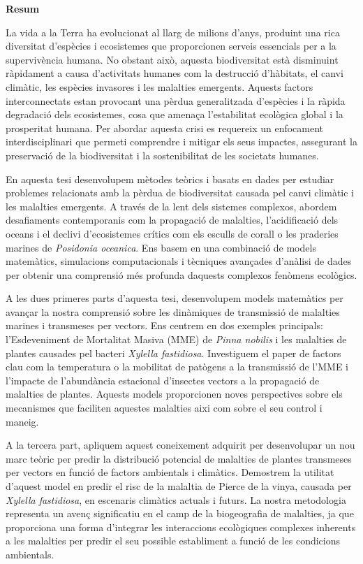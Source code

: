\begin{center}
    \textbf{\Large Resum}
\end{center}

La vida a la Terra ha evolucionat al llarg de milions d'anys,
produint una rica diversitat d'espècies i ecosistemes que proporcionen serveis
essencials per a la supervivència humana. No obstant això, aquesta
biodiversitat està disminuint ràpidament a causa d'activitats humanes
com la destrucció d'hàbitats, el canvi climàtic, les espècies invasores i les
malalties emergents. Aquests factors interconnectats estan provocant una pèrdua
generalitzada d'espècies i la ràpida degradació dels ecosistemes, cosa que
amenaça l'estabilitat ecològica global i la prosperitat humana. Per abordar
aquesta crisi es requereix un enfocament interdisciplinari que permeti
comprendre i mitigar els seus impactes, assegurant la preservació de la
biodiversitat i la sostenibilitat de les societats humanes.

En aquesta tesi desenvolupem mètodes teòrics i basats en dades per estudiar
problemes relacionats amb la pèrdua de biodiversitat causada pel canvi
climàtic i les malalties emergents. A través de la lent dels sistemes
complexos, abordem desafiaments contemporanis com la propagació de malalties,
l'acidificació dels oceans i el declivi d'ecosistemes crítics com els esculls
de corall o les praderies marines de \textit{Posidonia oceanica}. Ens basem en
una combinació de models matemàtics, simulacions computacionals i tècniques
avançades d'anàlisi de dades per obtenir una comprensió més profunda daquests
complexos fenòmens ecològics.

A les dues primeres parts d'aquesta tesi, desenvolupem models matemàtics
per avançar la nostra comprensió sobre les dinàmiques de transmissió de
malalties marines i transmeses per vectors. Ens centrem en dos exemples
principals:
l'Esdeveniment de Mortalitat Masiva (MME) de \textit{Pinna nobilis} i les
malalties de plantes causades pel bacteri \textit{Xylella fastidiosa}.
Investiguem el paper de factors clau com la temperatura o la mobilitat de
patògens a la transmissió de l'MME i l'impacte de l'abundància estacional
d'insectes vectors a la propagació de malalties de plantes. Aquests models
proporcionen noves perspectives sobre els mecanismes que faciliten aquestes
malalties aixi com sobre el seu control i maneig.

A la tercera part, apliquem aquest coneixement adquirit per desenvolupar un
nou marc teòric per predir la distribució potencial de malalties de
plantes transmeses per vectors en funció de factors ambientals i
climàtics. Demostrem la utilitat d'aquest model en predir el risc de la
malaltia de Pierce de la vinya, causada per \textit{Xylella fastidiosa}, en
escenaris climàtics actuals i futurs. La nostra metodologia representa un
avenç significatiu en el camp de la biogeografia de malalties, ja que
proporciona una forma d'integrar les interaccions ecològiques complexes
inherents a les malalties per predir el seu possible establiment a
funció de les condicions ambientals.

